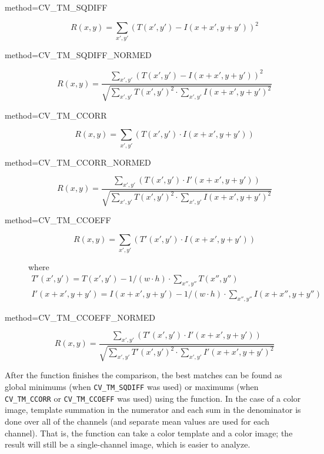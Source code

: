 \begin{description}
\item[method=CV\_TM\_SQDIFF]
\[ R(x,y)=\sum_{x',y'} (T(x',y')-I(x+x',y+y'))^2 \]

\item[method=CV\_TM\_SQDIFF\_NORMED]
\[ R(x,y)=\frac
{\sum_{x',y'} (T(x',y')-I(x+x',y+y'))^2}
{\sqrt{\sum_{x',y'}T(x',y')^2 \cdot \sum_{x',y'} I(x+x',y+y')^2}}
\]

\item[method=CV\_TM\_CCORR]
\[ R(x,y)=\sum_{x',y'} (T(x',y') \cdot I(x+x',y+y')) \]

\item[method=CV\_TM\_CCORR\_NORMED]
\[ R(x,y)=\frac
{\sum_{x',y'} (T(x',y') \cdot I'(x+x',y+y'))}
{\sqrt{\sum_{x',y'}T(x',y')^2 \cdot \sum_{x',y'} I(x+x',y+y')^2}}
\]

\item[method=CV\_TM\_CCOEFF]
\[ R(x,y)=\sum_{x',y'} (T'(x',y') \cdot I(x+x',y+y')) \]

where
\[ 
\begin{array}{l}
T'(x',y')=T(x',y') - 1/(w \cdot h) \cdot \sum_{x'',y''} T(x'',y'')\\
I'(x+x',y+y')=I(x+x',y+y') - 1/(w \cdot h) \cdot \sum_{x'',y''} I(x+x'',y+y'')
\end{array}
\]

\item[method=CV\_TM\_CCOEFF\_NORMED]
\[ R(x,y)=\frac
{ \sum_{x',y'} (T'(x',y') \cdot I'(x+x',y+y')) }
{ \sqrt{\sum_{x',y'}T'(x',y')^2 \cdot \sum_{x',y'} I'(x+x',y+y')^2} }
\]
\end{description}

After the function finishes the comparison, the best matches can be found as global minimums (when \texttt{CV\_TM\_SQDIFF} was used) or maximums (when \texttt{CV\_TM\_CCORR} or \texttt{CV\_TM\_CCOEFF} was used) using the  function. In the case of a color image, template summation in the numerator and each sum in the denominator is done over all of the channels (and separate mean values are used for each channel). That is, the function can take a color template and a color image; the result will still be a single-channel image, which is easier to analyze.

\fi
